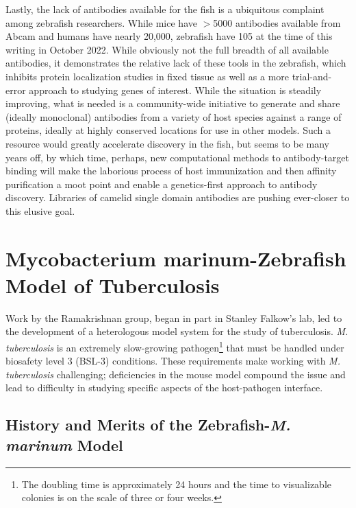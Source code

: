 Lastly, the lack of antibodies available for the fish is a ubiquitous complaint among zebrafish researchers. While mice have $>$5000 antibodies available from Abcam and humans have nearly 20,000, zebrafish have 105 at the time of this writing in October 2022. While obviously not the full breadth of all available antibodies, it demonstrates the relative lack of these tools in the zebrafish, which inhibits protein localization studies in fixed tissue as well as a more trial-and-error approach to studying genes of interest. While the situation is steadily improving, what is needed is a community-wide initiative to generate and share (ideally monoclonal) antibodies from a variety of host species against a range of proteins, ideally at highly conserved locations for use in other models. Such a resource would greatly accelerate discovery in the fish, but seems to be many years off, by which time, perhaps, new computational methods to antibody-target binding will make the laborious process of host immunization and then affinity purification a moot point and enable a genetics-first approach to antibody discovery. Libraries of camelid single domain antibodies are pushing ever-closer to this elusive goal.

\section{Mycobacterium marinum-Zebrafish Model of Tuberculosis}\label{zfmm}

\citep{Myllymaki2016, vanderSar2004}

Work by the Ramakrishnan group, began in part in Stanley Falkow's lab, led to the development of a heterologous model system for the study of tuberculosis. \textit{M. tuberculosis} is an extremely slow-growing pathogen\footnote{The doubling time is approximately 24 hours and the time to visualizable colonies is on the scale of three or four weeks.} that must be handled under biosafety level 3 (BSL-3) conditions. These requirements make working with \textit{M. tuberculosis} challenging; deficiencies in the mouse model compound the issue and lead to difficulty in studying specific aspects of the host-pathogen interface.

\subsection{History and Merits of the Zebrafish-\textit{M. marinum} Model}\label{zfmmhis}

